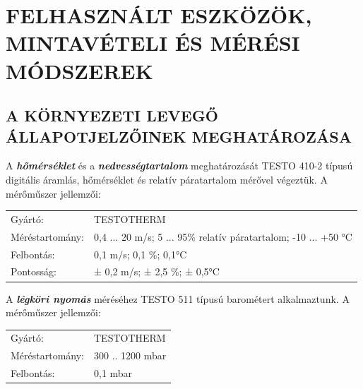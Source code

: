 \documentclass[a4paper,12pt]{article}
\begin{document}
	
	\newpage
	\section{FELHASZNÁLT ESZKÖZÖK, MINTAVÉTELI ÉS MÉRÉSI MÓDSZEREK}
	\subsection{A KÖRNYEZETI LEVEGŐ ÁLLAPOTJELZŐINEK MEGHATÁROZÁSA}
	
		\begin{adjustwidth}{1cm}{0cm}
			A \textbf{\textit{hőmérséklet}} és a \textbf{\textit{nedvességtartalom}} meghatározását TESTO 410-2 típusú digitális
			áramlás, hőmérséklet és relatív páratartalom mérővel végeztük. A mérőműszer
			jellemzői:
			
			\vspace{1.0em} %
			\noindent
			\centering 
			\begin{tabular}{ p{5.5cm} p{8cm} } 
				Gyártó: & TESTOTHERM \\
				Méréstartomány: & 0,4 ... 20 m/s; 5 ... 95\% relatív páratartalom;
				-10 ... +50 °C \\
				Felbontás: & 0,1 m/s; 0,1 \%; 0,1°C \\
				Pontosság: & ± 0,2 m/s; ± 2,5 \%; ± 0,5°C \\
			\end{tabular}
			
			
		\end{adjustwidth}
	
		\begin{adjustwidth}{1cm}{0cm}
			\vspace{1.0em} %
			A \textbf{\textit{légköri nyomás}} méréséhez TESTO 511 típusú barométert alkalmaztunk. A mérőműszer jellemzői:
			
			\vspace{1.0em} %
			\noindent
			\centering 
			\begin{tabular}{ p{5.5cm} p{8cm} } 
				Gyártó: & TESTOTHERM \\
				Méréstartomány: & 300 .. 1200 mbar \\
				Felbontás: & 0,1 mbar \\
			\end{tabular}
			
		\end{adjustwidth}
	
\end{document}
